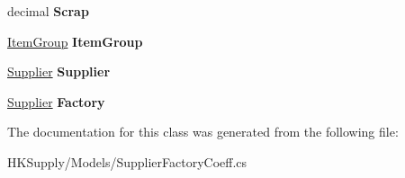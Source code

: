 \begin{DoxyCompactItemize}
decimal {\bfseries Scrap}
\item 
\mbox{\label{class_h_k_supply_1_1_models_1_1_supplier_factory_coeff_a9e0516d7e0e1567072a11fb092d98aba}} 
\mbox{\hyperlink{class_h_k_supply_1_1_models_1_1_item_group}{Item\+Group}} {\bfseries Item\+Group}
\item 
\mbox{\label{class_h_k_supply_1_1_models_1_1_supplier_factory_coeff_a03e5e4fcfc019106ea4fa53cacc5f49e}} 
\mbox{\hyperlink{class_h_k_supply_1_1_models_1_1_supplier}{Supplier}} {\bfseries Supplier}
\item 
\mbox{\label{class_h_k_supply_1_1_models_1_1_supplier_factory_coeff_a1f5b04cce00d4df785b33c5c36e2f087}} 
\mbox{\hyperlink{class_h_k_supply_1_1_models_1_1_supplier}{Supplier}} {\bfseries Factory}
\end{DoxyCompactItemize}


The documentation for this class was generated from the following file\+:\begin{DoxyCompactItemize}
\item 
H\+K\+Supply/\+Models/Supplier\+Factory\+Coeff.\+cs\end{DoxyCompactItemize}
